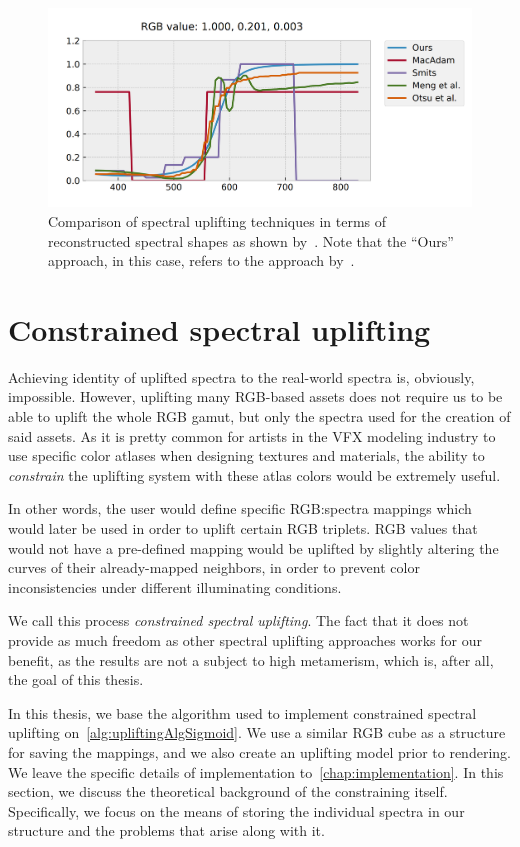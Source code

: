 \begin{figure}[t!]
	\centering
	\includegraphics[width=0.8\linewidth]{img/upsampling_techniques.png}
	\caption{Comparison of spectral uplifting techniques in terms of reconstructed spectral shapes as shown by~\citet{upsamplingJakobHanika}. Note that the ``Ours'' approach, in this case, refers to the approach by~\citet{upsamplingJakobHanika}.}
	\label{fig:upliftingTechniques}
\end{figure}

\section{Constrained spectral uplifting}

Achieving identity of uplifted spectra to the real-world spectra is, obviously, impossible. However, uplifting many RGB-based assets does not require us to be able to uplift the whole RGB gamut, but only the spectra used for the creation of said assets. As it is pretty common for artists in the VFX modeling industry to use specific color atlases when designing textures and materials, the ability to \emph{constrain} the uplifting system with these atlas colors would be extremely useful.

In other words, the user would define specific RGB:spectra mappings which would later be used in order to uplift certain RGB triplets. RGB values that would not have a pre-defined mapping would be uplifted by slightly altering the curves of their already-mapped neighbors, in order to prevent color inconsistencies under different illuminating conditions.

We call this process \emph{constrained spectral uplifting}. The fact that it does not provide as much freedom as other spectral uplifting approaches works for our benefit, as the results are not a subject to high metamerism, which is, after all, the goal of this thesis.

In this thesis, we base the algorithm used to implement constrained spectral uplifting on~\cref{alg:upliftingAlgSigmoid}. We use a similar RGB cube as a structure for saving the mappings, and we also create an uplifting model prior to rendering. We leave the specific details of implementation to~\cref{chap:implementation}. In this section, we discuss the theoretical background of the constraining itself. Specifically, we focus on the means of storing the individual spectra in our structure and the problems that arise along with it.


